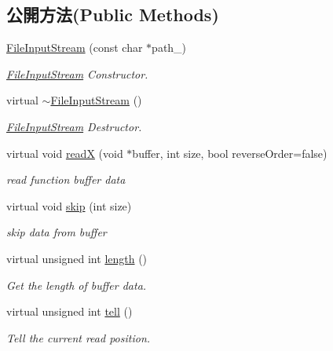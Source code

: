 \subsection*{公開方法(Public Methods)}
\begin{DoxyCompactItemize}
\item 
\hyperlink{class_i_dream_sky_1_1_file_input_stream_afa33d318b4347b10712e69270a8d3d2e}{File\+Input\+Stream} (const char $\ast$path\+\_\+)
\begin{DoxyCompactList}\small\item\em \hyperlink{class_i_dream_sky_1_1_file_input_stream}{File\+Input\+Stream} Constructor. \end{DoxyCompactList}\item 
virtual \hyperlink{class_i_dream_sky_1_1_file_input_stream_a48dfa318f2d5ebefc1489ac44edefde5}{$\sim$\+File\+Input\+Stream} ()
\begin{DoxyCompactList}\small\item\em \hyperlink{class_i_dream_sky_1_1_file_input_stream}{File\+Input\+Stream} Destructor. \end{DoxyCompactList}\item 
virtual void \hyperlink{class_i_dream_sky_1_1_file_input_stream_a5ca686c3e5ec27ce9c5cec39bae10cdb}{readX} (void $\ast$buffer, int size, bool reverse\+Order=false)
\begin{DoxyCompactList}\small\item\em read function buffer data \end{DoxyCompactList}\item 
virtual void \hyperlink{class_i_dream_sky_1_1_file_input_stream_a20d195e941f8dd8d65d7cb3e49828dae}{skip} (int size)
\begin{DoxyCompactList}\small\item\em skip data from buffer \end{DoxyCompactList}\item 
virtual unsigned int \hyperlink{class_i_dream_sky_1_1_file_input_stream_ae99ba0a3810c71ff84a16db9c73dd3ec}{length} ()
\begin{DoxyCompactList}\small\item\em Get the length of buffer data. \end{DoxyCompactList}\item 
virtual unsigned int \hyperlink{class_i_dream_sky_1_1_file_input_stream_a0d2d5c30a1bbaa3a9f4209fae1c953d8}{tell} ()
\begin{DoxyCompactList}\small\item\em Tell the current read position. \end{DoxyCompactList}\item 

\end{DoxyCompactItemize}
